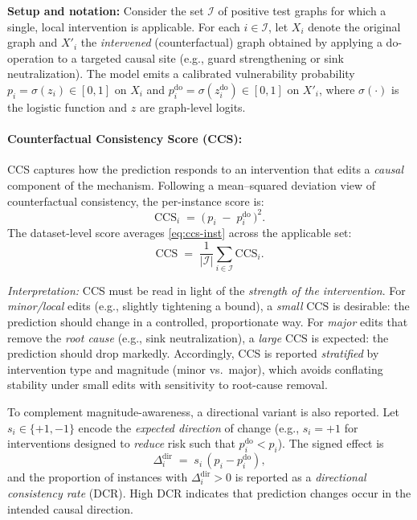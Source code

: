 \documentclass{buthesis}
\begin{document}
\textbf{Setup and notation:}
Consider the set $\mathcal{I}$ of positive test graphs for which a single, local intervention is applicable. For each $i\in\mathcal{I}$, let $X_i$ denote the original graph and $X'_i$ the \emph{intervened} (counterfactual) graph obtained by applying a do-operation to a targeted causal site (e.g., guard strengthening or sink neutralization). The model emits a calibrated vulnerability probability $p_i=\sigma(z_i)\in[0,1]$ on $X_i$ and $p_i^{\mathrm{do}}=\sigma(z_i^{\mathrm{do}})\in[0,1]$ on $X'_i$, where $\sigma(\cdot)$ is the logistic function and $z$ are graph-level logits.

\paragraph{Counterfactual Consistency Score (CCS):}
CCS captures how the prediction responds to an intervention that edits a \emph{causal} component of the mechanism. Following a mean–squared deviation view of counterfactual consistency, the per-instance score is:
\begin{equation}
\label{eq:ccs-inst}
\mathrm{CCS}_i \;=\; \big(\,p_i \;-\; p_i^{\mathrm{do}}\,\big)^2.
\end{equation}
The dataset-level score averages \eqref{eq:ccs-inst} across the applicable set:
\begin{equation}
\label{eq:ccs-avg}
\mathrm{CCS} \;=\; \frac{1}{|\mathcal{I}|}\sum_{i\in\mathcal{I}} \mathrm{CCS}_i.
\end{equation}

\textit{Interpretation:} CCS must be read in light of the \emph{strength of the intervention}. For \emph{minor/local} edits (e.g., slightly tightening a bound), a \emph{small} $\mathrm{CCS}$ is desirable: the prediction should change in a controlled, proportionate way. For \emph{major} edits that remove the \emph{root cause} (e.g., sink neutralization), a \emph{large} $\mathrm{CCS}$ is expected: the prediction should drop markedly. Accordingly, CCS is reported \emph{stratified} by intervention type and magnitude (minor vs.\ major), which avoids conflating stability under small edits with sensitivity to root-cause removal.

To complement magnitude-awareness, a directional variant is also reported. Let $s_i\in\{+1,-1\}$ encode the \emph{expected direction} of change (e.g., $s_i{=}+1$ for interventions designed to \emph{reduce} risk such that $p_i^{\mathrm{do}}\!<\!p_i$). The signed effect is
\begin{equation}
\label{eq:ccs-signed}
\Delta^{\mathrm{dir}}_i \;=\; s_i\,(p_i - p_i^{\mathrm{do}}),
\end{equation}
and the proportion of instances with $\Delta^{\mathrm{dir}}_i>0$ is reported as a \emph{directional consistency rate} (DCR). High DCR indicates that prediction changes occur in the intended causal direction.
\end{document}
